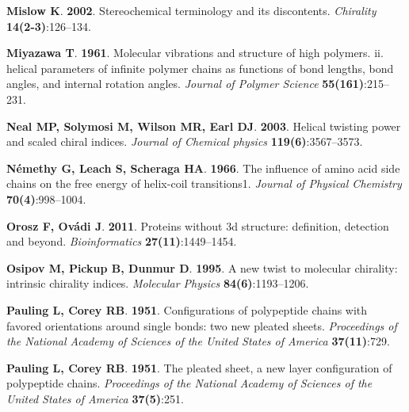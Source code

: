 \documentclass[fleqn,10pt,lineno]{wlpeerj} %
\begin{document}
\begin{thebibliography}{60}
\textbf{Mislow K}. \textbf{2002}.
\newblock Stereochemical terminology and its discontents.
\newblock \emph{Chirality} \textbf{14(2-3)}:126--134.

\textbf{Miyazawa T}. \textbf{1961}.
\newblock Molecular vibrations and structure of high polymers. ii. helical
  parameters of infinite polymer chains as functions of bond lengths, bond
  angles, and internal rotation angles.
\newblock \emph{Journal of Polymer Science} \textbf{55(161)}:215--231.

\textbf{Neal MP, Solymosi M, Wilson MR, Earl DJ}. \textbf{2003}.
\newblock Helical twisting power and scaled chiral indices.
\newblock \emph{Journal of Chemical physics} \textbf{119(6)}:3567--3573.

\textbf{N{\'e}methy G, Leach S, Scheraga HA}. \textbf{1966}.
\newblock The influence of amino acid side chains on the free energy of
  helix-coil transitions1.
\newblock \emph{Journal of Physical Chemistry} \textbf{70(4)}:998--1004.

\textbf{Orosz F, Ov{\'a}di J}. \textbf{2011}.
\newblock Proteins without 3d structure: definition, detection and beyond.
\newblock \emph{Bioinformatics} \textbf{27(11)}:1449--1454.

\textbf{Osipov M, Pickup B, Dunmur D}. \textbf{1995}.
\newblock A new twist to molecular chirality: intrinsic chirality indices.
\newblock \emph{Molecular Physics} \textbf{84(6)}:1193--1206.

\textbf{Pauling L, Corey RB}. \textbf{1951}{}.
\newblock Configurations of polypeptide chains with favored orientations around
  single bonds: two new pleated sheets.
\newblock \emph{Proceedings of the National Academy of Sciences of the United
  States of America} \textbf{37(11)}:729.

\textbf{Pauling L, Corey RB}. \textbf{1951}{}.
\newblock The pleated sheet, a new layer configuration of polypeptide chains.
\newblock \emph{Proceedings of the National Academy of Sciences of the United
  States of America} \textbf{37(5)}:251.


\end{thebibliography}
\end{document}

